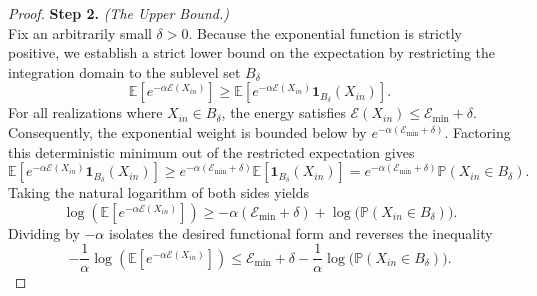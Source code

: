\documentclass[12pt]{amsart}
\numberwithin{equation}{section}
\begin{document}
\begin{proof}
\textbf{Step 2.} \textit{(The Upper Bound.)} \\
Fix an arbitrarily small $\delta > 0$. Because the exponential function is strictly positive, we establish a strict lower bound on the expectation by restricting the integration domain to the sublevel set $B_\delta$
\begin{equation*}
    \mathbb{E} \left[ e^{-\alpha \mathscr{E}(X_{in})} \right] \ge \mathbb{E} \left[ e^{-\alpha \mathscr{E}(X_{in})} \mathbf{1}_{B_\delta}(X_{in}) \right].
\end{equation*}
For all realizations where $X_{in} \in B_\delta$, the energy satisfies $\mathscr{E}(X_{in}) \le \mathscr{E}_{\min} + \delta$. Consequently, the exponential weight is bounded below by $e^{-\alpha (\mathscr{E}_{\min} + \delta)}$. Factoring this deterministic minimum out of the restricted expectation gives
\begin{equation*}
    \mathbb{E} \left[ e^{-\alpha \mathscr{E}(X_{in})} \mathbf{1}_{B_\delta}(X_{in}) \right] \ge e^{-\alpha (\mathscr{E}_{\min} + \delta)} \mathbb{E}[\mathbf{1}_{B_\delta}(X_{in})] = e^{-\alpha (\mathscr{E}_{\min} + \delta)} \mathbb{P}(X_{in} \in B_\delta).
\end{equation*}
Taking the natural logarithm of both sides yields
\begin{equation*}
    \log \left( \mathbb{E} \left[ e^{-\alpha \mathscr{E}(X_{in})} \right] \right) \ge -\alpha(\mathscr{E}_{\min} + \delta) + \log \big( \mathbb{P}(X_{in} \in B_\delta) \big).
\end{equation*}
Dividing by $-\alpha$ isolates the desired functional form and reverses the inequality
\begin{equation}\label{eq:laplace_upper_bound}
    -\frac{1}{\alpha} \log \left( \mathbb{E} \left[ e^{-\alpha \mathscr{E}(X_{in})} \right] \right) \le \mathscr{E}_{\min} + \delta - \frac{1}{\alpha} \log \big( \mathbb{P}(X_{in} \in B_\delta) \big).
\end{equation}


\end{proof}
\end{document}
